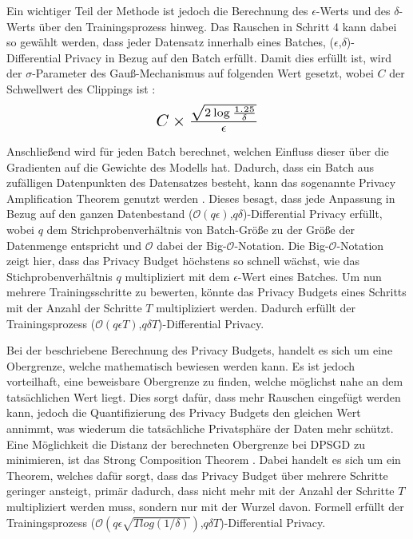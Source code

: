 Ein wichtiger Teil der Methode ist jedoch die Berechnung des $\epsilon$-Werts und des $\delta$-Werts über den Trainingsprozess hinweg.
Das Rauschen in Schritt 4 kann dabei so gewählt werden, dass jeder Datensatz innerhalb eines Batches, ($\epsilon$,$\delta$)-Differential Privacy in Bezug auf den Batch erfüllt.
Damit dies erfüllt ist, wird der $\sigma$-Parameter des Gauß-Mechanismus auf folgenden Wert gesetzt, wobei $C$ der Schwellwert des Clippings ist \cite{P-28}:
\begin{equation}
\resizebox{!}{0.7cm}{$
    C \times \frac{\sqrt{2\log\frac{1.25}{\delta}}}{\epsilon}
$}
\end{equation}

Anschließend wird für jeden Batch berechnet, welchen Einfluss dieser über die Gradienten auf die Gewichte des Modells hat.
Dadurch, dass ein Batch aus zufälligen Datenpunkten des Datensatzes besteht, kann das sogenannte Privacy Amplification Theorem genutzt werden \cite{P-107}. 
Dieses besagt, dass jede Anpassung in Bezug auf den ganzen Datenbestand ($\mathcal{O}(q\epsilon)$,$q\delta$)-Differential Privacy erfüllt, wobei $q$ dem Strichprobenverhältnis von Batch-Größe zu der Größe der Datenmenge entspricht und $\mathcal{O}$ dabei der Big-$\mathcal{O}$-Notation.
Die Big-$\mathcal{O}$-Notation zeigt hier, dass das Privacy Budget höchstens so schnell wächst, wie das Stichprobenverhältnis $q$ multipliziert mit dem $\epsilon$-Wert eines Batches.
Um nun mehrere Trainingsschritte zu bewerten, könnte das Privacy Budgets eines Schritts mit der Anzahl der Schritte $T$ multipliziert werden. 
Dadurch erfüllt der Trainingsprozess ($\mathcal{O}(q\epsilon T)$,$q\delta T$)-Differential Privacy.

Bei der beschriebene Berechnung des Privacy Budgets, handelt es sich um eine Obergrenze, welche mathematisch bewiesen werden kann.
Es ist jedoch vorteilhaft, eine beweisbare Obergrenze zu finden, welche möglichst nahe an dem tatsächlichen Wert liegt. 
Dies sorgt dafür, dass mehr Rauschen eingefügt werden kann, jedoch die Quantifizierung des Privacy Budgets den gleichen Wert annimmt, was wiederum die tatsächliche Privatsphäre der Daten mehr schützt.
Eine Möglichkeit die Distanz der berechneten Obergrenze bei DPSGD zu minimieren, ist das Strong Composition Theorem \cite{P-27}.
Dabei handelt es sich um ein Theorem, welches dafür sorgt, dass das Privacy Budget über mehrere Schritte geringer ansteigt, primär dadurch, dass nicht mehr mit der Anzahl der Schritte $T$ multipliziert werden muss, sondern nur mit der Wurzel davon.
Formell erfüllt der Trainingsprozess ($\mathcal{O}(q\epsilon \sqrt{T log(1/\delta)})$,$q\delta T$)-Differential Privacy.

